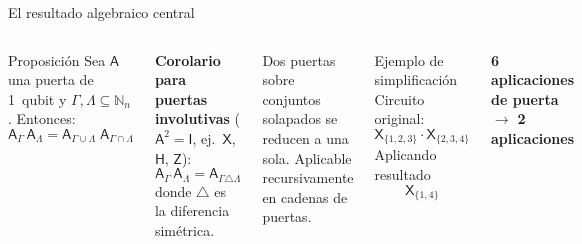 \documentclass[12pt, aspectratio=169]{beamer}
\newcommand{\qg}[1]{\mathsf{#1}}
\begin{document}
\begin{frame}{El resultado algebraico central}
  \begin{columns}[T]
    \begin{block}{Proposición}
      Sea $\qg{A}$ una puerta de 1~qubit y $\Gamma, \Lambda \subseteq \mathbb{N}_n$. Entonces:
      \[
        \boxed{\qg{A}_\Gamma\,\qg{A}_\Lambda
          = \qg{A}_{\Gamma \cup \Lambda}\;\qg{A}_{\Gamma \cap \Lambda}}
      \]
    \end{block}

    \medskip
    \textbf{Corolario para puertas involutivas} ($\qg{A}^2 = \qg{I}$,
    ej.\ $\qg{X}$, $\qg{H}$, $\qg{Z}$):
    \[
      \qg{A}_\Gamma\,\qg{A}_\Lambda = \qg{A}_{\Gamma \triangle \Lambda}
    \]
    donde $\triangle$ es la diferencia simétrica.

    \medskip
    \alert{Dos puertas sobre conjuntos solapados se reducen a una sola.}
    Aplicable recursivamente en cadenas de puertas.

    \begin{exampleblock}{Ejemplo de simplificación}
      \small
      Circuito original:
      \[
        \qg{X}_{\{1,2,3\}} \cdot \qg{X}_{\{2,3,4\}}
      \]
      Aplicando resultado
      \[
        \qg{X}_{\{1,4\}}
      \]
    \end{exampleblock}

    \begin{exampleblock}{}
      \centering\small
      \textbf{6 aplicaciones de puerta} $\rightarrow$ \textbf{2 aplicaciones}
    \end{exampleblock}
  \end{columns}
\end{frame}

\end{document}
